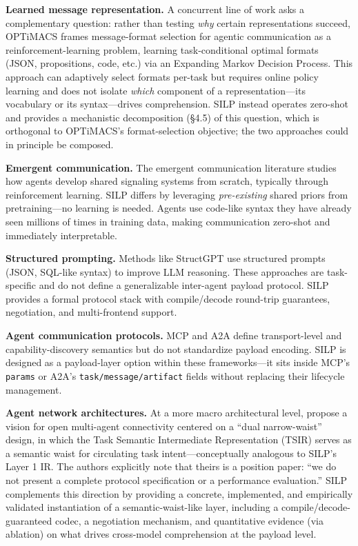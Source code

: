 \documentclass{article}
\begin{document}
\textbf{Learned message representation.} A concurrent line of work asks a complementary question: rather than testing \emph{why} certain representations succeed, OPTiMACS \citep{gupta2026learning} frames message-format selection for agentic communication as a reinforcement-learning problem, learning task-conditional optimal formats (JSON, propositions, code, etc.) via an Expanding Markov Decision Process. This approach can adaptively select formats per-task but requires online policy learning and does not isolate \emph{which} component of a representation---its vocabulary or its syntax---drives comprehension. SILP instead operates zero-shot and provides a mechanistic decomposition (\S4.5) of this question, which is orthogonal to OPTiMACS's format-selection objective; the two approaches could in principle be composed.



\textbf{Emergent communication.} The emergent communication literature \citep{havrylov2017emergence, lazaridou2017multiagent} studies how agents develop shared signaling systems from scratch, typically through reinforcement learning. SILP differs by leveraging \emph{pre-existing} shared priors from pretraining---no learning is needed. Agents use code-like syntax they have already seen millions of times in training data, making communication zero-shot and immediately interpretable.



\textbf{Structured prompting.} Methods like StructGPT \citep{jiang2023structgpt} use structured prompts (JSON, SQL-like syntax) to improve LLM reasoning. These approaches are task-specific and do not define a generalizable inter-agent payload protocol. SILP provides a formal protocol stack with compile/decode round-trip guarantees, negotiation, and multi-frontend support.



\textbf{Agent communication protocols.} MCP \citep{anthropic2024mcp} and A2A \citep{google2024a2a} define transport-level and capability-discovery semantics but do not standardize payload encoding. SILP is designed as a payload-layer option within these frameworks---it sits inside MCP's \texttt{params} or A2A's \texttt{task/message/artifact} fields without replacing their lifecycle management.



\textbf{Agent network architectures.} At a more macro architectural level, \citet{zhang2026agentnetwork} propose a vision for open multi-agent connectivity centered on a ``dual narrow-waist'' design, in which the Task Semantic Intermediate Representation (TSIR) serves as a semantic waist for circulating task intent---conceptually analogous to SILP's Layer 1 IR. The authors explicitly note that theirs is a position paper: ``we do not present a complete protocol specification or a performance evaluation.'' SILP complements this direction by providing a concrete, implemented, and empirically validated instantiation of a semantic-waist-like layer, including a compile/decode-guaranteed codec, a negotiation mechanism, and quantitative evidence (via ablation) on what drives cross-model comprehension at the payload level.
\end{document}
